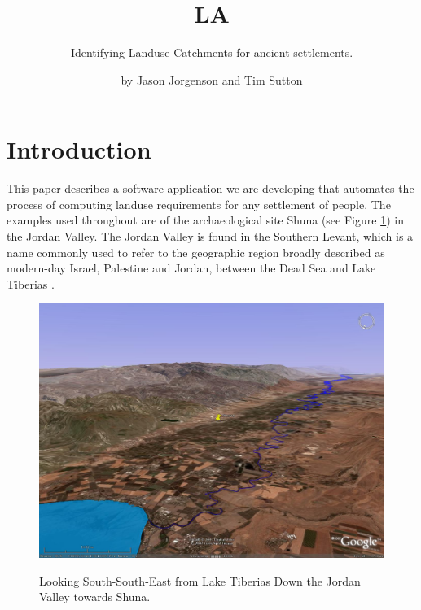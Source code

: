 

\title{LA} \subtitle{Identifying Landuse Catchments for 
ancient settlements.}

\author{by Jason Jorgenson and Tim Sutton}

\maketitle

\section{Introduction} \label{sec:Introduction}

This paper describes a software application we are developing that automates
the process of computing landuse requirements for any settlement of people.
The examples used throughout are of the archaeological site Shuna (see Figure \ref{fig:shunaGoogleEarth}) in the Jordan Valley.
The Jordan Valley is found in the Southern Levant, which is
a name commonly used to refer to the geographic region broadly described as
modern-day Israel, Palestine and Jordan, between the Dead Sea and Lake
Tiberias .

\begin{figure}[htbp] %
\includegraphics[scale=0.17]{./images/ShunaGoogleEarth3D.jpg}
\label{fig:shunaGoogleEarth} \caption{Looking South-South-East from Lake
Tiberias Down the Jordan Valley towards Shuna.} \end{figure}

